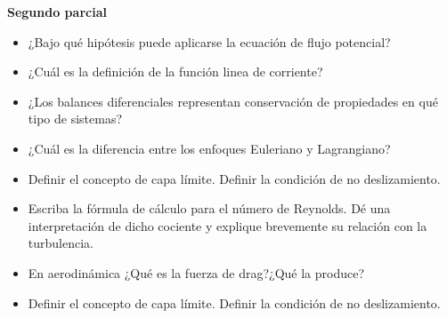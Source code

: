 \textbf{Segundo parcial}
\begin{itemize}
\item ¿Bajo qué hipótesis puede aplicarse la ecuación de flujo potencial?
\item ¿Cuál es la definición de la función linea de corriente?
\item ¿Los balances diferenciales representan conservación de propiedades en qué tipo de sistemas?
\item ¿Cuál es la diferencia entre los enfoques Euleriano y Lagrangiano?

\item Definir el concepto de capa límite. Definir la condición de no deslizamiento.
\item Escriba la fórmula de cálculo para el número de Reynolds. Dé una interpretación de dicho cociente y explique brevemente su relación con la turbulencia.
\item En aerodinámica ¿Qué es la fuerza de drag?¿Qué la produce?
\item Definir el concepto de capa límite. Definir la condición de no deslizamiento.


\end{itemize}
